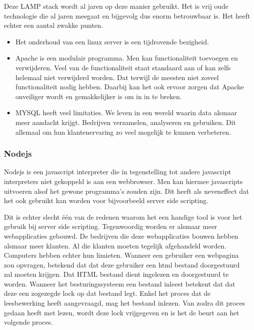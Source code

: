 \documentclass[a4paper,11pt]{article}
\begin{document}
Deze LAMP stack wordt al jaren op deze manier gebruikt. Het is vrij oude
technologie die al jaren meegaat en bijgevolg dus enorm betrouwbaar is. Het
heeft echter een aantal zwakke punten.

\begin{itemize}
  \item Het onderhoud van een linux server is een tijdrovende bezigheid.
  \item Apache is een modulair programma. Men kan functionaliteit toevoegen en
  verwijderen. Veel van de functionaliteit staat standaard aan of kan zelfs
  helemaal niet verwijderd worden. Dat terwijl de meesten niet zoveel
  functionaliteit nodig hebben. Daarbij kan het ook ervoor zorgen dat Apache
  onveiliger wordt en gemakkelijker is om in in te breken.
  \item MYSQL heeft veel limitaties. We leven in een wereld waarin data alsmaar
  meer aandacht krijgt. Bedrijven verzamelen, analyseren en gebruiken. Dit
  allemaal om hun klantenervaring zo veel mogelijk te kunnen verbeteren.
\end{itemize}

\subsubsection{Nodejs}
Nodejs is een javascript interpreter die in tegenstelling tot andere javascript interpreters niet gekoppeld is aan een webbrowser. Men kan hiermee javascripts uitvoeren alsof het gewone programma's zouden zijn. Dit heeft als neveneffect dat het ook gebruikt kan worden voor bijvoorbeeld server side scripting.

Dit is echter slecht één van de redenen waarom het een handige tool is voor het gebruik bij server side scripting. Tegenwoordig worden er alsmaar meer webapplicaties gebouwd. De bedrijven die deze webapplicaties bouwen hebben alsmaar meer klanten. Al die klanten moeten tegelijk afgehandeld worden. Computers hebben echter hun limieten. Wanneer een gebruiker een webpagina zou opvragen, betekend dat dat deze gebruiker een html bestand doorgestuurd zal moeten krijgen. Dat HTML bestand dient ingelezen en doorgestuurd te worden. Wanneer het besturingssysteem een bestand inleest betekent dat dat deze een zogezegde lock op dat bestand legt. Enkel het proces dat de leesbewerking heeft aangevraagd, mag het bestand inlezen. Van zodra dit proces gedaan heeft met lezen, wordt deze lock vrijgegeven en is het de beurt aan het volgende proces.
\end{document}
